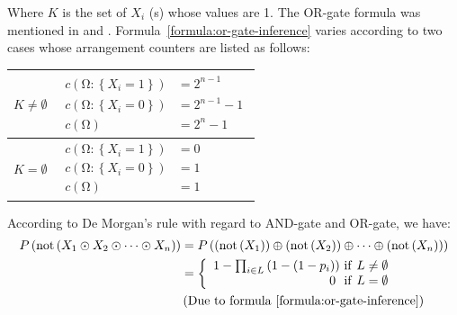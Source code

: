 \documentclass{article}
\numberwithin{equation}{section}
\numberwithin{figure}{section}
\numberwithin{table}{section}
\begin{document}
Where $K$ is the set of $X_i$ (s) whose values are 1. The OR-gate formula was mentioned in \cite[p.~158]{neapolitan:bn} and \cite[p.~20]{diez:pmodels}. Formula~\ref{formula:or-gate-inference} varies according to two cases whose arrangement counters are listed as follows:
\begin{center}
\begin{tabular}{l|l}
$K\neq \emptyset$ &
  $\begin{aligned}
  c\left(\mathrm{\Omega }:\left\{X_i=1\right\}\right)&=2^{n-1}\\
  c\left(\mathrm{\Omega }:\left\{X_i=0\right\}\right)&=2^{n-1}-1\\
  c\left(\mathrm{\Omega }\right)&=2^n-1
  \end{aligned}$\\
\hline
$K=\emptyset$ &
  $\begin{aligned}
  c\left(\mathrm{\Omega }:\left\{X_i=1\right\}\right)&=0\\
  c\left(\mathrm{\Omega }:\left\{X_i=0\right\}\right)&=1\\
  c\left(\mathrm{\Omega }\right)&=1
  \end{aligned}$
\end{tabular}
\end{center}
According to De Morgan's rule with regard to AND-gate and OR-gate, we have:
\begin{align*}
P\left(\mathrm{not}\left(X_1\odot X_2\odot \dots \odot X_n\right)\right)&=P\left(\left(\mathrm{not}\left(X_1\right)\right)\oplus \left(\mathrm{not}\left(X_2\right)\right)\oplus \dots \oplus \left(\mathrm{not}\left(X_n\right)\right)\right)\\
&=\left\{ \begin{array}{r}
1-\prod_{i\in L}{\left(1-\left(1-p_i\right)\right)}\ \mathrm{if}\ L\neq \emptyset  \\ 
0\ \ \mathrm{if}\ L=\emptyset  \end{array}
\right.\\
&\left(\mathrm{Due\ to\ formula~\ref{formula:or-gate-inference}}\right)
\end{align*}
\end{document}
